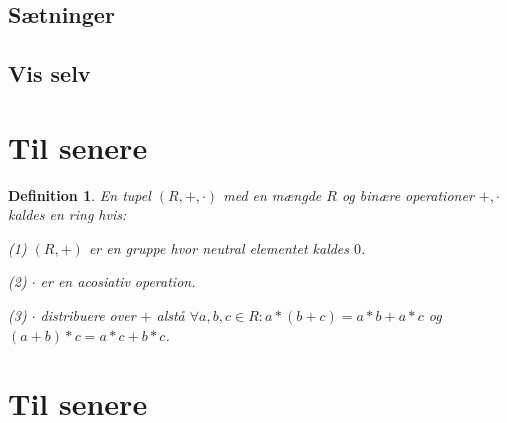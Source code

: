 \documentclass{article}
\newtheorem{defi}{Definition}
\begin{document}
{		\subsection*{Sætninger}
		\subsection*{Vis selv}
	\section*{Til senere}
		\begin{defi}
			En tupel $(R,+,\cdot)$ med en mængde $R$ og binære operationer $+, \cdot$
			kaldes en ring hvis:

			(1) $(R,+)$ er en gruppe hvor neutral elementet kaldes $0$.

			(2) $\cdot$ er en acosiativ operation.

			(3) $\cdot$ distribuere over $+$ alstå $\forall a,b,c \in R: a*(b+c)=a*b+a*c$
			og $(a+b)*c = a*c+b*c$.
		\end{defi}
	\section*{Til senere}
	}
\end{document}
